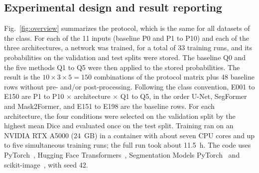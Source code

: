 \documentclass[final,5p,times,twocolumn]{elsarticle}
\begin{document}
\subsection{Experimental design and result reporting}\label{subsec:experimental_design}

Fig.~\ref{fig:overview} summarizes the protocol, which is the same for all datasets of the class. For each of the 11 inputs (baseline P0 and P1 to P10) and each of the three architectures, a network was trained, for a total of 33 training runs, and its probabilities on the validation and test splits were stored. The baseline Q0 and the five methods Q1 to Q5 were then applied to the stored probabilities. The result is the $10\times3\times5=150$ combinations of the protocol matrix plus 48 baseline rows without pre- and/or post-processing. Following the class convention, E001 to E150 are P1 to P10 $\times$ architecture $\times$ Q1 to Q5, in the order U-Net, SegFormer and Mask2Former, and E151 to E198 are the baseline rows. For each architecture, the four conditions were selected on the validation split by the highest mean Dice and evaluated once on the test split. Training ran on an NVIDIA RTX A5000 (24~GB) in a container with about seven CPU cores and up to five simultaneous training runs; the full run took about 11.5~h. The code uses PyTorch~\cite{paszke2019pytorch}, Hugging Face Transformers~\cite{wolf2020transformers}, Segmentation Models PyTorch~\cite{iakubovskii2019smp} and scikit-image~\cite{vanderwalt2014skimage}, with seed 42.
\end{document}
